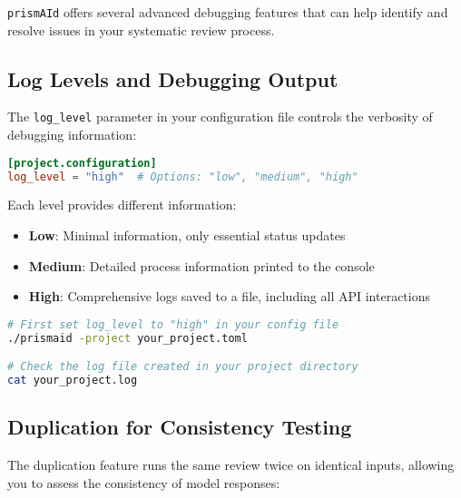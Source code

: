 \texttt{prismAId} offers several advanced debugging features that can help identify and resolve issues in your systematic review process.

\subsection{Log Levels and Debugging Output}

The \texttt{log\_level} parameter in your configuration file controls the verbosity of debugging information:

\begin{configbox}
\begin{lstlisting}[language=TOML]
[project.configuration]
log_level = "high"  # Options: "low", "medium", "high"
\end{lstlisting}
\end{configbox}

Each level provides different information:
\begin{itemize}
    \item \textbf{Low}: Minimal information, only essential status updates
    \item \textbf{Medium}: Detailed process information printed to the console
    \item \textbf{High}: Comprehensive logs saved to a file, including all API interactions
\end{itemize}

\begin{commandbox}
\begin{lstlisting}[language=Bash]
# First set log_level to "high" in your config file
./prismaid -project your_project.toml

# Check the log file created in your project directory
cat your_project.log
\end{lstlisting}
\end{commandbox}

\subsection{Duplication for Consistency Testing}

The duplication feature runs the same review twice on identical inputs, allowing you to assess the consistency of model responses:


